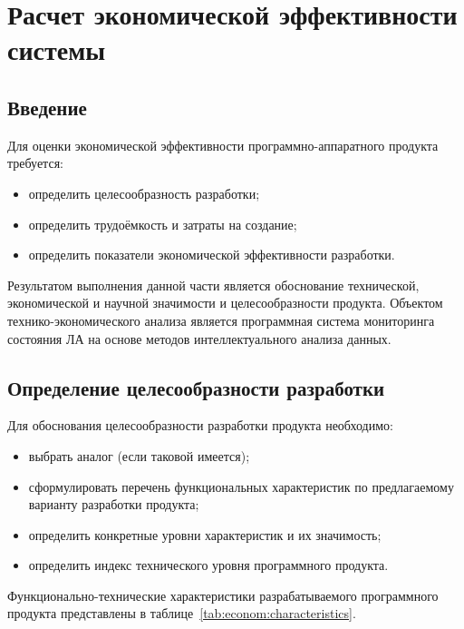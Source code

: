 \chapter{Расчет экономической эффективности системы}
\section{Введение}
Для оценки экономической эффективности программно-аппаратного продукта требуется:
\begin{itemize}
\item определить целесообразность разработки;
\item определить трудоёмкость и затраты на создание;
\item определить показатели экономической эффективности разработки.
\end{itemize}

Результатом выполнения данной части является обоснование технической, экономической и научной значимости и целесообразности продукта. Объектом технико-экономического анализа является программная система мониторинга состояния ЛА на основе методов интеллектуального анализа данных.

\section{Определение целесообразности разработки}
Для обоснования целесообразности разработки продукта необходимо:
\begin{itemize}
\item выбрать аналог (если таковой имеется);
\item сформулировать перечень функциональных характеристик по предлагаемому варианту разработки продукта;
\item определить конкретные уровни характеристик и их значимость;
\item определить индекс технического уровня программного продукта.
\end{itemize}

Функционально-технические характеристики разрабатываемого программного продукта представлены в таблице~\ref{tab:econom:characteristics}.

